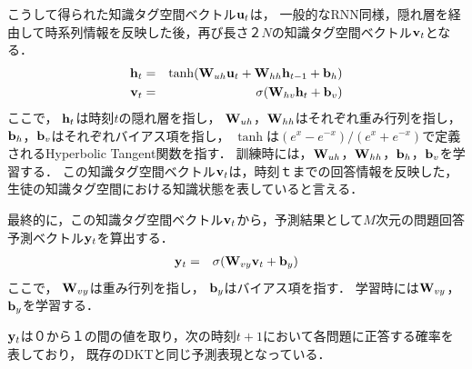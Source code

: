 こうして得られた知識タグ空間ベクトル${\bf u}_t$は，
一般的なRNN同様，隠れ層を経由して時系列情報を反映した後，再び長さ$２N$の知識タグ空間ベクトル${\bf v}_t$となる．
\begin{eqnarray}
{\bf h}_t &=& \tanh({\bf W}_{uh} {\bf u}_t + {\bf W}_{hh}  {\bf h}_{t-1} + {\bf b}_h)\\
{\bf v}_t &=& \sigma( {\bf W}_{hv} {\bf h}_t + {\bf b}_v)
\end{eqnarray}
ここで，
${\bf h}_t$は時刻$t$の隠れ層を指し，
${\bf W}_{uh}$，${\bf W}_{hh}$はそれぞれ重み行列を指し，
${\bf b}_h$，${\bf b}_v$はそれぞれバイアス項を指し，
$\tanh$は$( e^x - e^{-x} )/( e^x + e^{-x} )$で定義されるHyperbolic Tangent関数を指す．
訓練時には，${\bf W}_{uh}$，${\bf W}_{hh}$，${\bf b}_h$，${\bf b}_v$を学習する．
この知識タグ空間ベクトル${\bf v}_t$は，時刻$ｔ$までの回答情報を反映した，生徒の知識タグ空間における知識状態を表していると言える．

最終的に，この知識タグ空間ベクトル${\bf v}_t$から，予測結果として$M$次元の問題回答予測ベクトル${\bf y}_t$を算出する．
\begin{eqnarray}
{\bf y}_t &=& \sigma( {\bf W}_{vy} {\bf v}_t + {\bf b}_y)
\end{eqnarray}
ここで，
${\bf W}_{vy}$は重み行列を指し，
${\bf b}_y$はバイアス項を指す．
学習時には${\bf W}_{vy}$，${\bf b}_y$を学習する．

${\bf y}_t$は０から１の間の値を取り，次の時刻$t+1$において各問題に正答する確率を表しており，
既存のDKTと同じ予測表現となっている．



